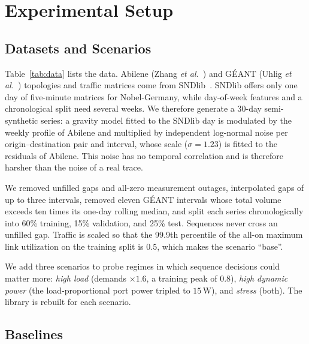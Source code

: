 \documentclass[journal]{IEEEtran}
\begin{document}
\section{Experimental Setup}\label{sec:setup}

\subsection{Datasets and Scenarios}

Table~\ref{tab:data} lists the data. Abilene (Zhang \emph{et al.}~\cite{zhang2003tomogravity}) and G\'{E}ANT (Uhlig \emph{et al.}~\cite{uhlig2006geant}) topologies and traffic matrices come from SNDlib~\cite{orlowski2010sndlib}. SNDlib offers only one day of five-minute matrices for Nobel-Germany, while day-of-week features and a chronological split need several weeks. We therefore generate a 30-day semi-synthetic series: a gravity model fitted to the SNDlib day is modulated by the weekly profile of Abilene and multiplied by independent log-normal noise per origin--destination pair and interval, whose scale ($\sigma=1.23$) is fitted to the residuals of Abilene. This noise has no temporal correlation and is therefore harsher than the noise of a real trace.

We removed unfilled gaps and all-zero measurement outages, interpolated gaps of up to three intervals, removed eleven G\'{E}ANT intervals whose total volume exceeds ten times its one-day rolling median, and split each series chronologically into 60\% training, 15\% validation, and 25\% test. Sequences never cross an unfilled gap. Traffic is scaled so that the 99.9th percentile of the all-on maximum link utilization on the training split is $0.5$, which makes the scenario ``base''.

We add three scenarios to probe regimes in which sequence decisions could matter more: \emph{high load} (demands $\times1.6$, a training peak of $0.8$), \emph{high dynamic power} (the load-proportional port power tripled to $15$\,W), and \emph{stress} (both). The library is rebuilt for each scenario.

\begin{table}[t]
\centering
\caption{Topologies and Traffic Data}
\label{tab:data}
\footnotesize
\setlength{\tabcolsep}{2.5pt}

\end{table}

\subsection{Baselines}
\end{document}

